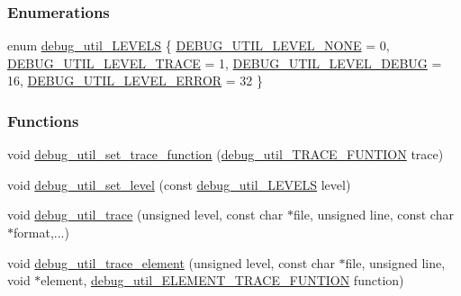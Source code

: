 \subsubsection*{Enumerations}
\begin{DoxyCompactItemize}
\item 
enum \hyperlink{a00001_aa67647dffda81c4bf40a22606de434db}{debug\-\_\-util\-\_\-\-L\-E\-V\-E\-L\-S} \{ \hyperlink{a00001_aa67647dffda81c4bf40a22606de434dba5d2e193de4fef2db09055144384e6c29}{D\-E\-B\-U\-G\-\_\-\-U\-T\-I\-L\-\_\-\-L\-E\-V\-E\-L\-\_\-\-N\-O\-N\-E} =  0, 
\hyperlink{a00001_aa67647dffda81c4bf40a22606de434dba8cfdc9de8fc139c9bcc40ef2324f1547}{D\-E\-B\-U\-G\-\_\-\-U\-T\-I\-L\-\_\-\-L\-E\-V\-E\-L\-\_\-\-T\-R\-A\-C\-E} =  1, 
\hyperlink{a00001_aa67647dffda81c4bf40a22606de434dba6063a46d3dacfc5c0352f90d38621342}{D\-E\-B\-U\-G\-\_\-\-U\-T\-I\-L\-\_\-\-L\-E\-V\-E\-L\-\_\-\-D\-E\-B\-U\-G} =  16, 
\hyperlink{a00001_aa67647dffda81c4bf40a22606de434dbab9f2453beabe40f7737958371fdaa120}{D\-E\-B\-U\-G\-\_\-\-U\-T\-I\-L\-\_\-\-L\-E\-V\-E\-L\-\_\-\-E\-R\-R\-O\-R} =  32
 \}
\end{DoxyCompactItemize}
\subsubsection*{Functions}
\begin{DoxyCompactItemize}
\item 
void \hyperlink{a00001_ab0003a6a8fd130a4b50ac633f6bf3e6e}{debug\-\_\-util\-\_\-set\-\_\-trace\-\_\-function} (\hyperlink{a00001_aea1a1da48f9be116b8ec308d8bc29b76}{debug\-\_\-util\-\_\-\-T\-R\-A\-C\-E\-\_\-\-F\-U\-N\-T\-I\-O\-N} trace)
\item 
void \hyperlink{a00001_ab013a5a2e9972c0c09a0bba4baccaeaf}{debug\-\_\-util\-\_\-set\-\_\-level} (const \hyperlink{a00001_aa67647dffda81c4bf40a22606de434db}{debug\-\_\-util\-\_\-\-L\-E\-V\-E\-L\-S} level)
\item 
void \hyperlink{a00001_a3c7765ea1964ef3f9afa6fc919b58196}{debug\-\_\-util\-\_\-trace} (unsigned level, const char $\ast$file, unsigned line, const char $\ast$format,...)
\item 
void \hyperlink{a00001_adcc77339ec3396c54a56cae414e4866e}{debug\-\_\-util\-\_\-trace\-\_\-element} (unsigned level, const char $\ast$file, unsigned line, void $\ast$element, \hyperlink{a00001_acb797b3ccc582e3330d3cf3e761b3616}{debug\-\_\-util\-\_\-\-E\-L\-E\-M\-E\-N\-T\-\_\-\-T\-R\-A\-C\-E\-\_\-\-F\-U\-N\-T\-I\-O\-N} function)
\end{DoxyCompactItemize}


